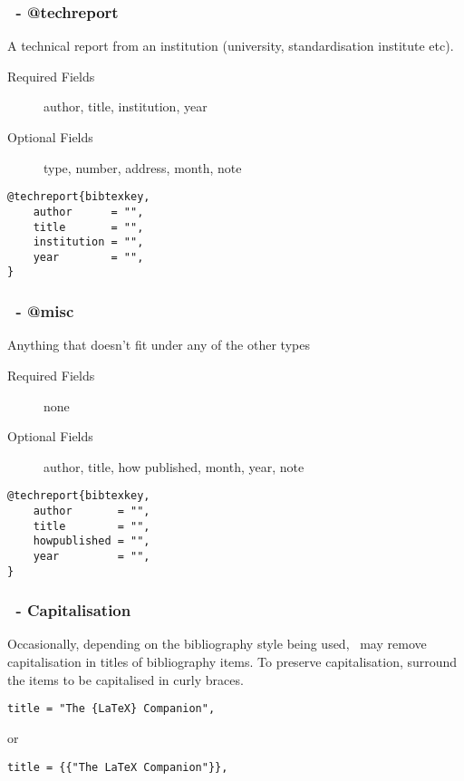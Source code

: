 \documentclass[mathserif]{beamer}
\begin{document}
\begin{frame}[fragile]
\frametitle{\BibTeX\ - @techreport}
\vfill
A technical report from an institution (university, standardisation institute etc).
\vfill
\begin{description}
	\item[Required Fields] author, title, institution, year
	\item[Optional Fields] type, number, address, month, note
	\end{description}
\vfill
\begin{lstlisting}[style=latexsty]
@techreport{bibtexkey,
    author      = "",
    title       = "",
    institution = "",
    year        = "",
}
\end{lstlisting}
\vfill
\end{frame}

\begin{frame}[fragile]
\frametitle{\BibTeX\ - @misc}
\vfill
Anything that doesn't fit under any of the other types
\vfill
\begin{description}
	\item[Required Fields] none
	\item[Optional Fields] author, title, how published, month, year, note
	\end{description}
\vfill
\begin{lstlisting}[style=latexsty]
@techreport{bibtexkey,
    author       = "",
    title        = "",
    howpublished = "",
    year         = "",
}
\end{lstlisting}
\vfill
\end{frame}

\begin{frame}[fragile]
\frametitle{\BibTeX\ - Capitalisation}
\vfill
Occasionally, depending on the bibliography style being used, \BibTeX\ may remove capitalisation in titles of bibliography items.
\vfill
To preserve capitalisation, surround the items to be capitalised in curly braces.
\vfill
\begin{lstlisting}[style=latexsty]
    title = "The {LaTeX} Companion",
\end{lstlisting}
\vfill
or
\vfill
\begin{lstlisting}[style=latexsty]
    title = {{"The LaTeX Companion"}},
\end{lstlisting}
\vfill
\end{frame}
\end{document}
